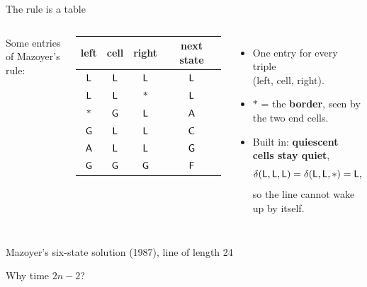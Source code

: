 \begin{frame}{The rule is a table}
\begin{columns}[T]
\small Some entries of Mazoyer's rule:\\[1ex]
\renewcommand{\arraystretch}{1.25}
\begin{tabular}{cccc}
\toprule
left & cell & right & next state\\
\midrule
$\mathsf L$ & $\mathsf L$ & $\mathsf L$ & $\mathsf L$\\
$\mathsf L$ & $\mathsf L$ & $\ast$ & $\mathsf L$\\
$\ast$ & $\mathsf G$ & $\mathsf L$ & $\mathsf A$\\
$\mathsf G$ & $\mathsf L$ & $\mathsf L$ & $\mathsf C$\\
$\mathsf A$ & $\mathsf L$ & $\mathsf L$ & $\mathsf G$\\
$\mathsf G$ & $\mathsf G$ & $\mathsf G$ & $\mathsf F$\\
\bottomrule
\end{tabular}
\begin{itemize}
\item One entry for every triple\\ (left, cell, right).
\item $\ast$ = the \textbf{border}, seen by the two end cells.
\item Built in: \textbf{quiescent cells stay quiet},
\[\delta(\mathsf L,\mathsf L,\mathsf L)=\delta(\mathsf L,\mathsf L,\ast)=\mathsf L,\]
so the line cannot wake up by itself.
\end{itemize}
\end{columns}
\end{frame}

\begin{frame}{Mazoyer's six-state solution (1987), line of length 24}
\centering{}
\end{frame}

\begin{frame}{Why time $2n-2$?}
\centering{}
\end{frame}

